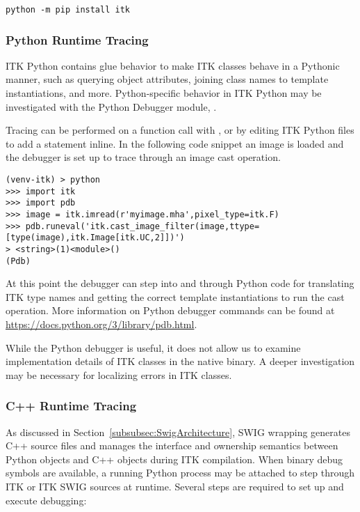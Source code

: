 \begin{verbatim}
python -m pip install itk
\end{verbatim}


\subsubsection{Python Runtime Tracing}
\label{subsubsec:PythonRuntimeTracing}

ITK Python contains glue behavior to make ITK classes behave in a Pythonic manner,
such as querying object attributes, joining class names to template instantiations, and more.
Python-specific behavior in ITK Python may be investigated with the
Python Debugger module, .

Tracing can be performed on a function call with , or by editing ITK Python
files to add a  statement inline. In the following code snippet
an image is loaded and the debugger is set up to trace through an image cast operation.

\begin{verbatim}
(venv-itk) > python
>>> import itk
>>> import pdb
>>> image = itk.imread(r'myimage.mha',pixel_type=itk.F)
>>> pdb.runeval('itk.cast_image_filter(image,ttype=[type(image),itk.Image[itk.UC,2]])')
> <string>(1)<module>()
(Pdb)
\end{verbatim}

At this point the debugger can step into and through Python code for translating ITK
type names and getting the correct template instantiations to run the cast operation. More
information on Python debugger commands can be found at
\href{https://docs.python.org/3/library/pdb.html}{https://docs.python.org/3/library/pdb.html}.

While the Python debugger is useful, it does not allow us to examine implementation
details of ITK classes in the native binary. A deeper investigation may be necessary for localizing
errors in ITK classes.


\subsubsection{C++ Runtime Tracing}
\label{subsubsec:CppRuntimeTracing}

As discussed in Section~\ref{subsubsec:SwigArchitecture}, SWIG wrapping generates
C++ source files and manages the interface and ownership semantics between
Python objects and C++ objects during ITK compilation.
When binary debug symbols are available, a running Python process may be attached to step through
ITK or ITK SWIG sources at runtime. Several steps are required to set up and execute debugging:

